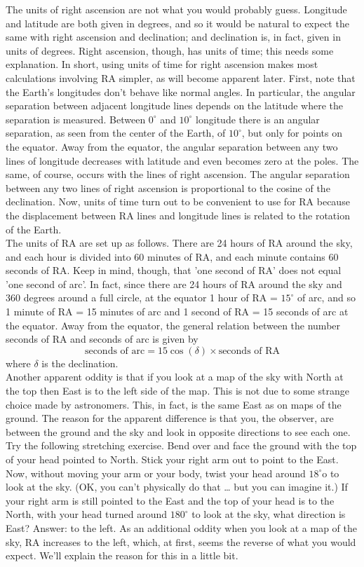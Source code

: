 \documentclass[10pt]{report}
\begin{document}
The units of right ascension are not what you would probably guess.  Longitude and latitude are both given in degrees, and so it would be natural to expect the same with right ascension and declination; and declination is, in fact, given in units of degrees.  Right ascension, though, has units of time; this needs some explanation.  In short, using units of time for right ascension makes most calculations involving RA simpler, as will become apparent later. First, note that the Earth's longitudes don't behave like normal angles. In particular, the angular separation between adjacent longitude lines depends on the latitude where the separation is measured.  Between $0^\circ$ and $10^\circ$ longitude there is an angular separation, as seen from the center of the Earth, of $10^\circ$, but only for points on the equator.  Away from the equator, the angular separation between any two lines of longitude decreases with latitude and even becomes zero at the poles.  The same, of course, occurs with the lines of right ascension.  The angular separation between any two lines of right ascension is proportional to the cosine of the declination.  Now, units of time turn out to be convenient to use for RA because the displacement between RA lines and longitude lines is related to the rotation of the Earth.\\
The units of RA are set up as follows.  There are 24 hours of RA around the sky, and each hour is divided into 60 minutes of RA, and each minute contains 60 seconds of RA.  Keep in mind, though, that 'one second of RA' does not equal 'one second of arc'.  In fact, since there are 24 hours of RA around the sky and 360 degrees around a full circle, at the equator 1 hour of RA = $15^\circ$ of arc, and so 1 minute of RA = 15 minutes of arc and 1 second of RA = 15 seconds of arc at the equator.  Away from the equator, the general relation between the number seconds of RA and seconds of arc is given by 
\begin{equation}
\text{seconds of arc}=15\cos(\delta)\times \text{seconds of RA}
\end{equation}
where $\delta$ is the declination.\\
Another apparent oddity is that if you look at a map of the sky with North at the top then East is to the left side of the map.  This is not due to some strange choice made by astronomers.  This, in fact, is the same East as on maps of the ground.  The reason for the apparent difference is that you, the observer, are between the ground and the sky and look in opposite directions to see each one.  Try the following stretching exercise.  Bend over and face the ground with the top of your head pointed to North.  Stick your right arm out to point to the East.  Now, without moving your arm or your body, twist your head around $18^\circ$o to look at the sky. (OK, you can't physically do that … but you can imagine it.)  If your right arm is still pointed to the East and the top of your head is to the North, with your head turned around $180^\circ$ to look at the sky, what direction is East?  Answer: to the left.  As an additional oddity when you look at a map of the sky, RA increases to the left, which, at first, seems the reverse of what you would expect.  We'll explain the reason for this in a little bit. 
\end{document}
